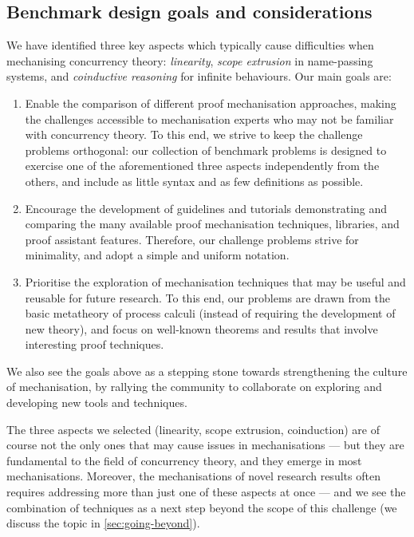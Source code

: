 \documentclass[runningheads]{llncs}
\begin{document}
\subsection*{Benchmark design goals and considerations}%

We have identified three key aspects which typically cause difficulties when
mechanising concurrency theory: \emph{linearity}, \emph{scope extrusion} in
name-passing systems, and \emph{coinductive reasoning} for infinite behaviours.
Our main goals are:

\begin{enumerate}
\item Enable the comparison of different proof mechanisation approaches, making
  the challenges accessible to mechanisation experts who may not be familiar
  with concurrency theory. To this end, we strive to keep the challenge problems
  orthogonal: our collection of benchmark problems is designed to exercise one
  of the aforementioned three aspects independently from the others, and include
  as little syntax and as few definitions as possible.

\item Encourage the development of guidelines and tutorials demonstrating and
  comparing the many available proof mechanisation techniques, libraries, and
  proof assistant features.  Therefore, our challenge problems strive for
  minimality, and adopt a simple and uniform notation.

\item Prioritise the exploration of mechanisation techniques that may be useful
  and reusable for future research. To this end, our problems are drawn from the
  basic metatheory of process calculi (instead of requiring the development of
  new theory), and focus on well-known theorems and results that involve
  interesting proof techniques.
\end{enumerate}

We also see the goals above as a stepping stone towards strengthening the
culture of mechanisation, by rallying the community to collaborate on exploring
and developing new tools and techniques. 

The three aspects we selected (linearity, scope extrusion, coinduction) are of
course not the only ones that may cause issues in mechanisations --- but they
are fundamental to the field of concurrency theory, and they emerge in most
mechanisations.  Moreover, the mechanisations of novel research results often
requires addressing more than just one of these aspects at once --- and we see
the combination of techniques as a next step beyond the scope of this challenge
(we discuss the topic in \cref{sec:going-beyond}).
\end{document}
